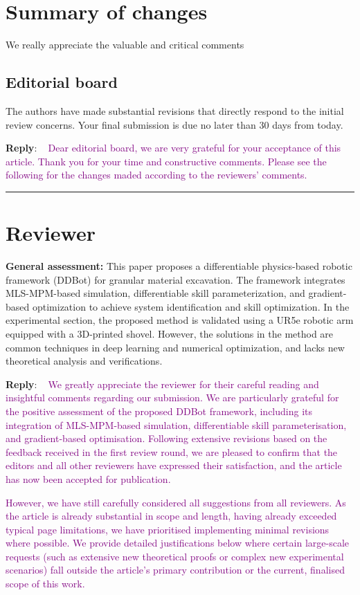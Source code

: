 \documentclass[11pt]{article}
\newcounter{reviewer}
\newcounter{point}[reviewer]
\newcounter{suggestion}
\newcommand{\reviewersection}{\stepcounter{reviewer} \bigskip \hrule
                  \section*{Reviewer \thereviewer}}
\newenvironment{reply}
   {\medskip \noindent \begin{sf}\textbf{Reply}: \  }
   {\medskip \end{sf}}
\newcommand{\rp}[1]{\textcolor{purple}{#1}}
\begin{document}
\section*{Summary of changes}
We really appreciate the valuable and critical comments 


\subsection*{Editorial board}
The authors have made substantial revisions that directly respond to the initial review concerns. Your final submission is due no later than 30 days from today.

\begin{reply}
\rp{Dear editorial board, we are very grateful for your acceptance of this article. Thank you for your time and constructive comments. Please see the following for the changes maded according to the reviewers' comments.}
\end{reply}

\clearpage
\reviewersection
\textbf{General assessment:} This paper proposes a differentiable physics-based robotic framework
(DDBot) for granular material excavation. The framework integrates
MLS-MPM-based simulation, differentiable skill parameterization, and
gradient-based optimization to achieve system identification and skill
optimization. In the experimental section, the proposed method is
validated using a UR5e robotic arm equipped with a 3D-printed shovel.
However, the solutions in the method are common techniques in deep
learning and numerical optimization, and lacks new theoretical analysis and verifications.

\begin{reply}
\rp{We greatly appreciate the reviewer for their careful reading and insightful comments regarding our submission. We are particularly grateful for the positive assessment of the proposed DDBot framework, including its integration of MLS-MPM-based simulation, differentiable skill parameterisation, and gradient-based optimisation.
Following extensive revisions based on the feedback received in the first review round, we are pleased to confirm that the editors and all other reviewers have expressed their satisfaction, and the article has now been accepted for publication.}

\rp{However, we have still carefully considered all suggestions from all reviewers. As the article is already substantial in scope and length, having already exceeded typical page limitations, we have prioritised implementing minimal revisions where possible. We provide detailed justifications below where certain large-scale requests (such as extensive new theoretical proofs or complex new experimental scenarios) fall outside the article's primary contribution or the current, finalised scope of this work.}

\end{reply}
\end{document}
